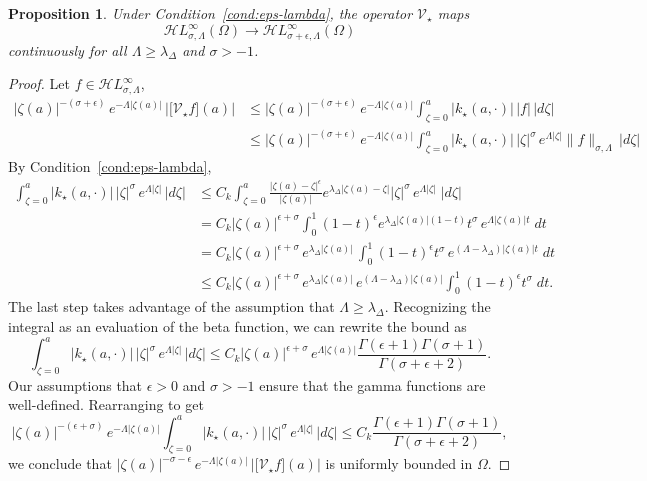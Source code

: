 \documentclass{article}
\theoremstyle{plain}
\newtheorem{prop}{Proposition}
\newcommand{\singexp}[2]{\mathcal{H}L^\infty_{#1, #2}}
\newcommand{\softpart}{\mathcal{V}_\star}
\newcommand{\softker}{k_\star}
\newcommand{\domain}{\Omega}
\begin{document}
\begin{prop}\label{prop:smoothing}
Under {\em Condition~\eqref{cond:eps-lambda}}, the operator $\softpart$ maps
\[ \singexp{\sigma}{\Lambda}(\Omega) \to \singexp{\sigma+\epsilon}{\Lambda}(\Omega) \]
continuously for all $\Lambda\geq \lambda_{\Delta}$ and $\sigma>-1$.
\end{prop}

\begin{proof}
    Let $f\in\singexp{\sigma}{\Lambda}$,
    \begin{align*}
        |\zeta(a)|^{-(\sigma+\epsilon)} \, e^{-\Lambda |\zeta(a)|} \, \Big \vert \big[ \softpart f\big](a)\Big\vert
        &\leq |\zeta(a)|^{-(\sigma+\epsilon)}\, e^{-\Lambda |\zeta(a)|} \int_{\zeta=0}^a |\softker(a,\cdot)|\, |f| \, |d\zeta| \\
        &\leq |\zeta(a)|^{-(\sigma+\epsilon)}\, e^{-\Lambda |\zeta(a)|} \int_{\zeta=0}^a |\softker(a,\cdot)|\, |\zeta|^{\sigma}\, e^{\Lambda |\zeta|} \|f\|_{\sigma,\Lambda} \, |d\zeta| 
    \end{align*}
    By Condition~\eqref{cond:eps-lambda},
    \begin{align*}
         \int_{\zeta=0}^a |\softker(a,\cdot)|\, |\zeta|^{\sigma}\, e^{\Lambda |\zeta|} \, |d\zeta| &\leq C_k \int_{\zeta=0}^a \frac{|\zeta(a)-\zeta|^\epsilon}{|\zeta(a)|} e^{\lambda_\Delta |\zeta(a)-\zeta|} |\zeta|^{\sigma}\, e^{\Lambda|\zeta|}\;|d\zeta|\\
         &=C_k |\zeta(a)|^{\epsilon+\sigma} \int_{0}^1 (1-t)^\epsilon e^{\lambda_\Delta |\zeta(a)|(1-t)} t^{\sigma}\, e^{\Lambda|\zeta(a)| t}\;dt\\
         &=C_k |\zeta(a)|^{\epsilon+\sigma}\, e^{\lambda_\Delta |\zeta(a)|}\,  \int_{0}^1 (1-t)^\epsilon  t^{\sigma}\,e^{(\Lambda-\lambda_\Delta)|\zeta(a)| t}\;dt\\
         &\le C_k |\zeta(a)|^{\epsilon+\sigma}\, e^{\lambda_\Delta |\zeta(a)|}\,e^{(\Lambda-\lambda_\Delta)|\zeta(a)|}\int_{0}^1 (1-t)^\epsilon  t^{\sigma}\;dt.
    \end{align*}
    The last step takes advantage of the assumption that $\Lambda \ge \lambda_\Delta$. Recognizing the integral as an evaluation of the beta function, we can rewrite the bound as
    \[ \int_{\zeta=0}^a |\softker(a,\cdot)|\, |\zeta|^{\sigma}\, e^{\Lambda |\zeta|} \, |d\zeta| \le C_k |\zeta(a)|^{\epsilon+\sigma}\, e^{\Lambda |\zeta(a)|} \frac{\Gamma(\epsilon+1)\Gamma(\sigma+1)}{\Gamma(\sigma+\epsilon+2)}. \]
    Our assumptions that $\epsilon > 0$ and $\sigma > -1$ ensure that the gamma functions are well-defined. Rearranging to get
    \[ |\zeta(a)|^{-(\epsilon+\sigma)}\, e^{-\Lambda |\zeta(a)|} \int_{\zeta=0}^a |\softker(a,\cdot)|\, |\zeta|^{\sigma}\, e^{\Lambda |\zeta|} \, |d\zeta| \le C_k \frac{\Gamma(\epsilon+1)\Gamma(\sigma+1)}{\Gamma(\sigma+\epsilon+2)}, \]
    we conclude that $|\zeta(a)|^{-\sigma-\epsilon} \, e^{-\Lambda |\zeta(a)|} \, \Big \vert \big[ \softpart f\big](a)\Big\vert$ is uniformly bounded in $\domain$. 
\end{proof}
\end{document}
